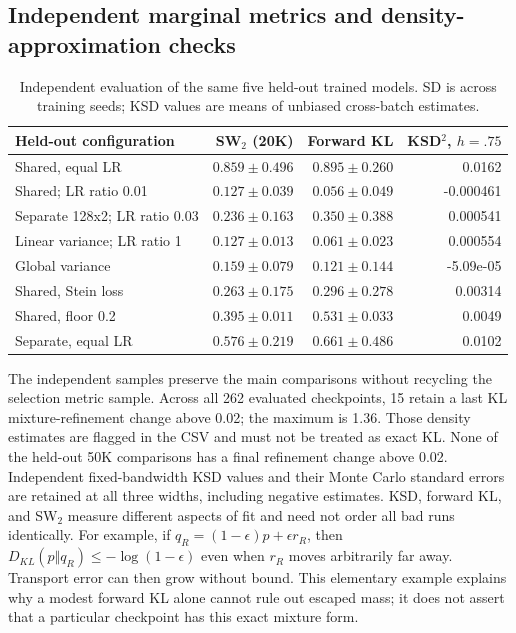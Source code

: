 \documentclass[11pt,a4paper]{article}
\begin{document}
\subsection{Independent marginal metrics and density-approximation checks}
\begin{table}[H]\centering\small
\caption{Independent evaluation of the same five held-out trained models. SD is across training seeds; KSD values are means of unbiased cross-batch estimates.}
\begin{tabular}{@{}>{\raggedright\arraybackslash}p{6.1cm}rrr@{}}
\toprule
Held-out configuration & SW$_2$ (20K) & Forward KL & KSD$^2$, $h=.75$ \\ \midrule
Shared, equal LR & $0.859\pm0.496$ & $0.895\pm0.260$ & 0.0162 \\
Shared; LR ratio 0.01 & $0.127\pm0.039$ & $0.056\pm0.049$ & -0.000461 \\
Separate 128x2; LR ratio 0.03 & $0.236\pm0.163$ & $0.350\pm0.388$ & 0.000541 \\
Linear variance; LR ratio 1 & $0.127\pm0.013$ & $0.061\pm0.023$ & 0.000554 \\
Global variance & $0.159\pm0.079$ & $0.121\pm0.144$ & -5.09e-05 \\
Shared, Stein loss & $0.263\pm0.175$ & $0.296\pm0.278$ & 0.00314 \\
Shared, floor 0.2 & $0.395\pm0.011$ & $0.531\pm0.033$ & 0.0049 \\
Separate, equal LR & $0.576\pm0.219$ & $0.661\pm0.486$ & 0.0102 \\
\bottomrule\end{tabular}\end{table}
The independent samples preserve the main comparisons without recycling the selection metric sample. Across all 262 evaluated checkpoints, 15 retain a last KL mixture-refinement change above 0.02; the maximum is 1.36. Those density estimates are flagged in the CSV and must not be treated as exact KL. None of the held-out 50K comparisons has a final refinement change above 0.02. Independent fixed-bandwidth KSD values and their Monte Carlo standard errors are retained at all three widths, including negative estimates. KSD, forward KL, and SW$_2$ measure different aspects of fit and need not order all bad runs identically. For example, if $q_R=(1-\epsilon)p+\epsilon r_R$, then $D_{KL}(p\Vert q_R)\le-\log(1-\epsilon)$ even when $r_R$ moves arbitrarily far away. Transport error can then grow without bound. This elementary example explains why a modest forward KL alone cannot rule out escaped mass; it does not assert that a particular checkpoint has this exact mixture form.
\end{document}
